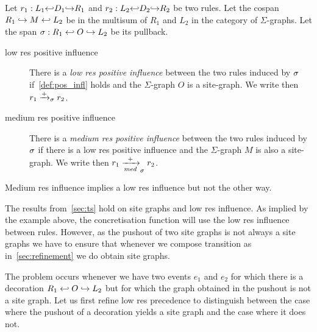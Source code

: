 \begin{definition}
  Let $r_1:L_1{\hookleftarrow} D_1 {\hookrightarrow} R_1$ and $r_2:L_2{\hookleftarrow} D_2 {\hookrightarrow} R_2$ be two rules.
  Let the cospan $R_1\hookrightarrow M\hookleftarrow L_2$ be in the multisum of $R_1$ and $L_2$ in the category of $\Sigma$-graphs. Let the span $\sigma:R_1\hookleftarrow O\hookrightarrow L_2$ be its pullback.
  \begin{description}
  \item[low res positive influence]
    There is a \emph{low res positive influence} between the two rules induced by $\sigma$ if~\autoref{def:pos_infl} holds and the $\Sigma$-graph $O$ is a site-graph.  We write then $r_1\mathrel{\xrightarrow{+}}_{\sigma} r_2$.
  \item[medium res positive influence]
    There is a \emph{medium res positive influence} between the two rules induced by $\sigma$ if there is a low res positive influence and the $\Sigma$-graph $M$ is also a site-graph. We write then $r_1\xrightarrow[med]{+}_{\sigma} r_2$.
  \end{description}
\end{definition}
Medium res influence implies a low res influence but not the other way.

%
The results from~\autoref{sec:ts} hold on site graphs and low res influence. As implied by the example above, the concretisation function will use the low res influence between rules. However, as the pushout of two site graphs is not always a site graphs we have to ensure that whenever we compose transition as in~\autoref{sec:refinement} we do obtain site graphs.

The problem occurs whenever we have two events $e_1$ and $e_2$ for which there is a decoration $R_1\hookleftarrow O\hookrightarrow L_2$ but for which the graph obtained in the pushout is not a site graph. Let us first refine low res precedence to distinguish between the case where the pushout of a decoration yields a site graph and the case where it does not.

